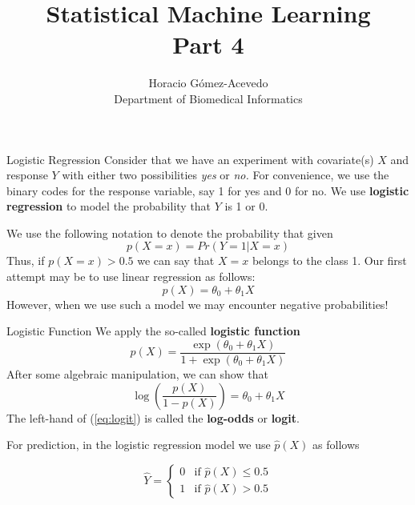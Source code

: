\documentclass{beamer}
\title{Statistical Machine Learning\\ Part 4}
\author{Horacio G\'omez-Acevedo\\ Department of Biomedical Informatics}
\begin{document}
	\begin{frame}[plain]
		\maketitle
	\end{frame}
\begin{frame}{Logistic Regression}
	Consider that we have an experiment with covariate(s) $X$ and response $Y$ with either two possibilities {\it yes} or {\it no.}
	For convenience, we use the binary codes for the response variable, say 1 for yes and 0 for no. We use {\bf logistic regression} to model the probability that $Y$ is 1 or 0. 
	
	We use the following notation to denote the probability that given 
	\begin{equation*}
		p(X=x)= Pr(Y=1 | X=x)
	\end{equation*}
 Thus, if $p(X=x)>0.5$ we can say that $X=x$ belongs to the class 1. 
 Our first attempt may be to use linear regression as follows:
 \begin{equation*}
 	p(X)= \theta_0+ \theta_1 X
 \end{equation*}
However, when we use such a model we may encounter negative probabilities!

\end{frame}

\begin{frame}{Logistic Function}
	We apply the so-called {\bf logistic function}
	\begin{equation*}
		p(X)= \frac{\exp(\theta_0+ \theta_1 X)}{1+ \exp(\theta_0+\theta_1 X)} 
	\end{equation*}
	After some algebraic manipulation, we can show that
	\begin{equation}
		\log \left( \frac{p(X)}{1-p(X)} \right) = \theta_0 + \theta_1 X
\label{eq:logit}	
\end{equation}
The left-hand of (\ref{eq:logit}) is called the {\bf log-odds} or {\bf logit}.

For prediction, in the logistic regression model we use $\hat{p}(X)$ as follows 

\begin{equation*}
	\hat{Y}=
	\begin{cases}
		0 & \textrm{if } \hat{p}(X)  \le 0.5 \\
		1 &  \textrm{if } \hat{p}(X) > 0.5
	\end{cases}
\end{equation*}
\end{frame}
\end{document}
